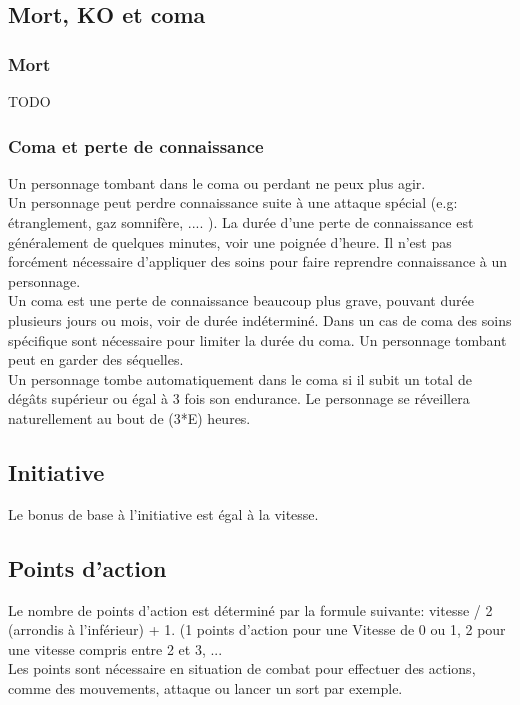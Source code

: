 \subsection{Mort, KO et coma}

\subsubsection*{Mort}
TODO

\subsubsection*{Coma et perte de connaissance}
Un personnage tombant dans le coma ou perdant ne peux plus agir. \\
Un personnage peut perdre connaissance suite à une attaque spécial (e.g: étranglement, gaz somnifère, .... ). La durée d'une perte de connaissance est généralement  de quelques minutes, voir une poignée d'heure. Il n'est pas forcément nécessaire d'appliquer des soins pour faire reprendre connaissance à un personnage. \\
Un coma est une perte de connaissance beaucoup plus grave, pouvant durée plusieurs jours ou mois, voir de durée indéterminé. Dans un cas de coma des soins spécifique sont nécessaire pour limiter la durée du coma. Un personnage tombant peut en garder des séquelles. \\
Un personnage tombe automatiquement dans le coma si il subit un total de dégâts supérieur ou égal à 3 fois son endurance. Le personnage se réveillera naturellement au bout de (3*E) heures. 

\subsection{Initiative}
Le bonus de base à l'initiative est égal à la vitesse.

\subsection{Points d'action}
Le nombre de points d'action est déterminé par la formule suivante: vitesse / 2 (arrondis à l'inférieur) + 1. (1 points d'action pour une Vitesse de 0 ou 1, 2 pour une vitesse compris entre 2 et  3, ... \\
Les points sont nécessaire en situation de combat pour effectuer des actions, comme des mouvements, attaque ou lancer un sort par exemple. \\

